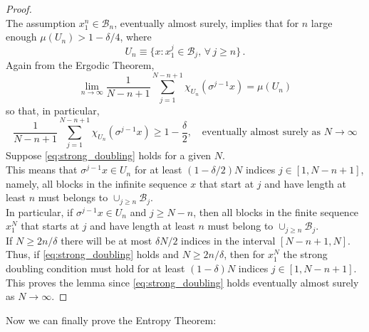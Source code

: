 \begin{proof}
    \hfill \\
    The assumption $x_1^n \in \mathcal{B}_n$, eventually almost surely, implies that for $n$ large enough $\mu(U_n) > 1 - \delta/4$, where
    \begin{equation*}
        U_n \equiv \{ x : x_1^j \in \mathcal{B}_j, \, \forall \, j \geq n \} \, .
    \end{equation*}
    Again from the Ergodic Theorem, 
    \begin{equation*}
        \lim_{n \rightarrow \infty} \frac{1}{N-n+1} \sum_{j=1}^{N-n+1} \chi_{U_n} (\sigma^{j-1} x) = \mu(U_n)
    \end{equation*}
    so that, in particular,
    \begin{equation}
    \label{eq:strong_doubling}
         \frac{1}{N-n+1} \sum_{j=1}^{N-n+1} \chi_{U_n} (\sigma^{j-1} x) \geq 1 - \frac{\delta}{2}, \quad \text{eventually almost surely as $N \rightarrow \infty$}
    \end{equation}
    Suppose \ref{eq:strong_doubling} holds for a given $N$.
    \\This means that $\sigma^{j-1} x \in U_n$ for at least $(1 - \delta/2)N$ indices $j \in [1, N - n+1]$, namely, all blocks in the infinite sequence $x$ that start at $j$ and have length at least $n$ must belongs to $\cup_{j \geq n} \mathcal{B}_j$.
    \\In particular, if $\sigma^{j-1} x \in U_n$ and $j \geq N-n$, then all blocks in the finite sequence $x_1^N$ that starts at $j$ and have length at least $n$ must belong to $\cup_{j \geq n} \mathcal{B}_j$. 
    \\If $N \geq 2n/\delta$ there will be at most $\delta N/2$ indices in the interval $[N-n+1,N]$.
    \\Thus, if \ref{eq:strong_doubling} holds and $N \geq 2n/\delta$, then for $x_1^N$ the strong doubling condition must
    hold for at least $(1 - \delta)N$ indices $j \in [1, N-n+1]$.
    \\This proves the lemma since \ref{eq:strong_doubling} holds eventually almost surely as $N \rightarrow \infty$.
\end{proof}
Now we can finally prove the Entropy Theorem:
